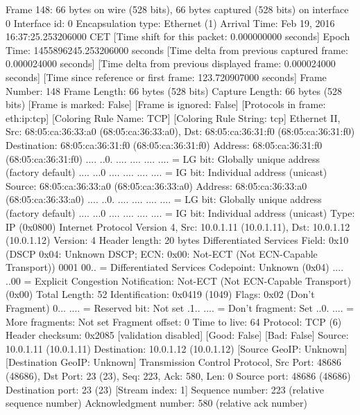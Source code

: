 Frame 148: 66 bytes on wire (528 bits), 66 bytes captured (528 bits) on interface 0
    Interface id: 0
    Encapsulation type: Ethernet (1)
    Arrival Time: Feb 19, 2016 16:37:25.253206000 CET
    [Time shift for this packet: 0.000000000 seconds]
    Epoch Time: 1455896245.253206000 seconds
    [Time delta from previous captured frame: 0.000024000 seconds]
    [Time delta from previous displayed frame: 0.000024000 seconds]
    [Time since reference or first frame: 123.720907000 seconds]
    Frame Number: 148
    Frame Length: 66 bytes (528 bits)
    Capture Length: 66 bytes (528 bits)
    [Frame is marked: False]
    [Frame is ignored: False]
    [Protocols in frame: eth:ip:tcp]
    [Coloring Rule Name: TCP]
    [Coloring Rule String: tcp]
Ethernet II, Src: 68:05:ca:36:33:a0 (68:05:ca:36:33:a0), Dst: 68:05:ca:36:31:f0 (68:05:ca:36:31:f0)
    Destination: 68:05:ca:36:31:f0 (68:05:ca:36:31:f0)
        Address: 68:05:ca:36:31:f0 (68:05:ca:36:31:f0)
        .... ..0. .... .... .... .... = LG bit: Globally unique address (factory default)
        .... ...0 .... .... .... .... = IG bit: Individual address (unicast)
    Source: 68:05:ca:36:33:a0 (68:05:ca:36:33:a0)
        Address: 68:05:ca:36:33:a0 (68:05:ca:36:33:a0)
        .... ..0. .... .... .... .... = LG bit: Globally unique address (factory default)
        .... ...0 .... .... .... .... = IG bit: Individual address (unicast)
    Type: IP (0x0800)
Internet Protocol Version 4, Src: 10.0.1.11 (10.0.1.11), Dst: 10.0.1.12 (10.0.1.12)
    Version: 4
    Header length: 20 bytes
    Differentiated Services Field: 0x10 (DSCP 0x04: Unknown DSCP; ECN: 0x00: Not-ECT (Not ECN-Capable Transport))
        0001 00.. = Differentiated Services Codepoint: Unknown (0x04)
        .... ..00 = Explicit Congestion Notification: Not-ECT (Not ECN-Capable Transport) (0x00)
    Total Length: 52
    Identification: 0x0419 (1049)
    Flags: 0x02 (Don't Fragment)
        0... .... = Reserved bit: Not set
        .1.. .... = Don't fragment: Set
        ..0. .... = More fragments: Not set
    Fragment offset: 0
    Time to live: 64
    Protocol: TCP (6)
    Header checksum: 0x2085 [validation disabled]
        [Good: False]
        [Bad: False]
    Source: 10.0.1.11 (10.0.1.11)
    Destination: 10.0.1.12 (10.0.1.12)
    [Source GeoIP: Unknown]
    [Destination GeoIP: Unknown]
Transmission Control Protocol, Src Port: 48686 (48686), Dst Port: 23 (23), Seq: 223, Ack: 580, Len: 0
    Source port: 48686 (48686)
    Destination port: 23 (23)
    [Stream index: 1]
    Sequence number: 223    (relative sequence number)
    Acknowledgment number: 580    (relative ack number)
